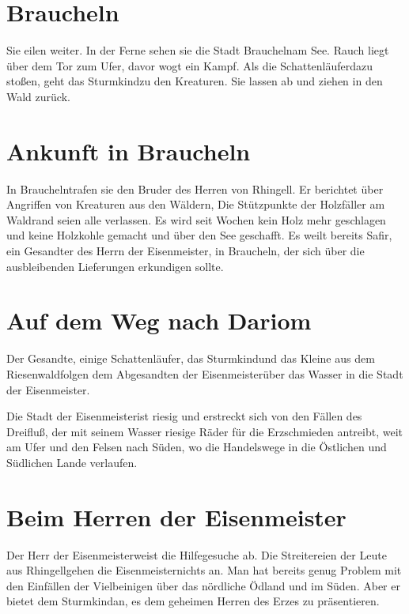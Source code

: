 \documentclass[12pt,a4paper,onecolumn,twoside,ngerman]{book}
\newcommand{\Sturmkind}{Sturmkind}
\newcommand{\Schattenlaufer}{Schattenläufer}
\newcommand{\Rhingell}{Rhingell}
\newcommand{\Dreifluss}{Dreifluß}
\newcommand{\Braucheln}{Braucheln}
\newcommand{\Riesenwald}{Riesenwald}
\newcommand{\Eisenmeister}{Eisenmeister}
\newcommand{\Dariom}{Dariom}
\newcommand{\Safir}{Safir}
\begin{document}
\section{\Braucheln}
Sie eilen weiter. In der Ferne sehen sie die Stadt \Braucheln am See. Rauch liegt über dem Tor zum Ufer, davor wogt ein Kampf. Als die \Schattenlaufer dazu stoßen, geht das \Sturmkind zu den Kreaturen. Sie lassen ab und ziehen in den Wald zurück.

\section{Ankunft in \Braucheln}
In \Braucheln trafen sie den Bruder des Herren von \Rhingell. Er berichtet über Angriffen von Kreaturen aus den Wäldern, Die Stützpunkte der Holzfäller am Waldrand seien alle verlassen. Es wird seit Wochen kein Holz mehr geschlagen und keine Holzkohle gemacht und über den See geschafft. Es weilt bereits \Safir, ein Gesandter des Herrn der \Eisenmeister, in \Braucheln, der sich über die ausbleibenden Lieferungen erkundigen sollte.

\section{Auf dem Weg nach \Dariom}
Der Gesandte, einige \Schattenlaufer, das \Sturmkind und das Kleine aus dem \Riesenwald folgen dem Abgesandten der \Eisenmeister über das Wasser in die Stadt der \Eisenmeister.

Die Stadt der \Eisenmeister ist riesig und erstreckt sich von den Fällen des \Dreifluss, der mit seinem Wasser riesige Räder für die Erzschmieden antreibt, weit am Ufer und den Felsen nach Süden, wo die Handelswege in die Östlichen und Südlichen Lande verlaufen.

\section{Beim Herren der \Eisenmeister}
Der Herr der \Eisenmeister weist die Hilfegesuche ab. Die Streitereien der Leute aus \Rhingell gehen die \Eisenmeister nichts an. Man hat bereits genug Problem mit den Einfällen der Vielbeinigen über das nördliche Ödland und im Süden. Aber er bietet dem \Sturmkind an, es dem geheimen Herren des Erzes zu präsentieren.
\end{document}
